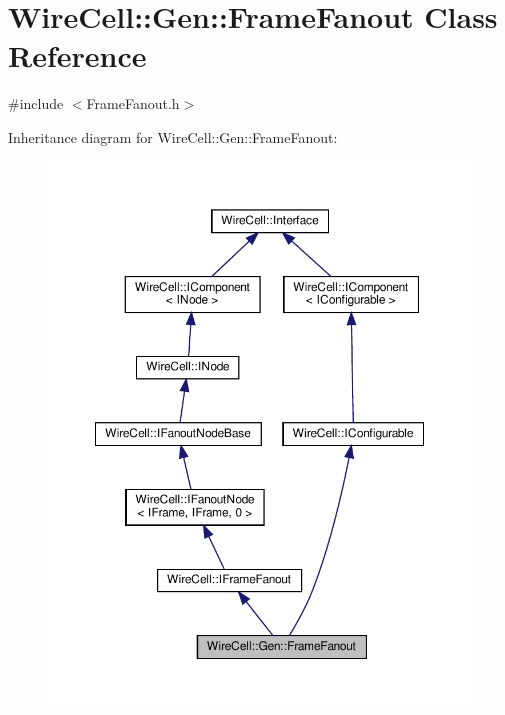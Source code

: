 \hypertarget{class_wire_cell_1_1_gen_1_1_frame_fanout}{}\section{Wire\+Cell\+:\+:Gen\+:\+:Frame\+Fanout Class Reference}
\label{class_wire_cell_1_1_gen_1_1_frame_fanout}


{\ttfamily \#include $<$Frame\+Fanout.\+h$>$}



Inheritance diagram for Wire\+Cell\+:\+:Gen\+:\+:Frame\+Fanout\+:
\nopagebreak
\begin{figure}[H]
\begin{center}
\leavevmode
\includegraphics[width=350pt]{class_wire_cell_1_1_gen_1_1_frame_fanout__inherit__graph}
\end{center}
\end{figure}


